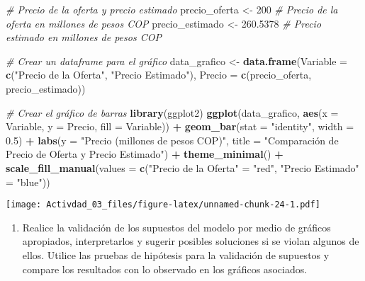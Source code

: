 \documentclass[
]{article}
\newenvironment{Shaded}{\begin{snugshade}}{\end{snugshade}}
\newcommand{\AttributeTok}[1]{\textcolor[rgb]{0.13,0.29,0.53}{#1}}
\newcommand{\CommentTok}[1]{\textcolor[rgb]{0.56,0.35,0.01}{\textit{#1}}}
\newcommand{\DecValTok}[1]{\textcolor[rgb]{0.00,0.00,0.81}{#1}}
\newcommand{\FloatTok}[1]{\textcolor[rgb]{0.00,0.00,0.81}{#1}}
\newcommand{\FunctionTok}[1]{\textcolor[rgb]{0.13,0.29,0.53}{\textbf{#1}}}
\newcommand{\NormalTok}[1]{#1}
\newcommand{\OtherTok}[1]{\textcolor[rgb]{0.56,0.35,0.01}{#1}}
\newcommand{\SpecialCharTok}[1]{\textcolor[rgb]{0.81,0.36,0.00}{\textbf{#1}}}
\newcommand{\StringTok}[1]{\textcolor[rgb]{0.31,0.60,0.02}{#1}}
\providecommand{\tightlist}{%
  \setlength{\itemsep}{0pt}\setlength{\parskip}{0pt}}
\begin{document}
\begin{Shaded}
\begin{Highlighting}[]
\CommentTok{\# Precio de la oferta y precio estimado}
\NormalTok{precio\_oferta }\OtherTok{\textless{}{-}} \DecValTok{200}  \CommentTok{\# Precio de la oferta en millones de pesos COP}
\NormalTok{precio\_estimado }\OtherTok{\textless{}{-}} \FloatTok{260.5378}  \CommentTok{\# Precio estimado en millones de pesos COP}

\CommentTok{\# Crear un dataframe para el gráfico}
\NormalTok{data\_grafico }\OtherTok{\textless{}{-}} \FunctionTok{data.frame}\NormalTok{(}\AttributeTok{Variable =} \FunctionTok{c}\NormalTok{(}\StringTok{"Precio de la Oferta"}\NormalTok{, }\StringTok{"Precio Estimado"}\NormalTok{),}
                           \AttributeTok{Precio =} \FunctionTok{c}\NormalTok{(precio\_oferta, precio\_estimado))}

\CommentTok{\# Crear el gráfico de barras}
\FunctionTok{library}\NormalTok{(ggplot2)}
\FunctionTok{ggplot}\NormalTok{(data\_grafico, }\FunctionTok{aes}\NormalTok{(}\AttributeTok{x =}\NormalTok{ Variable, }\AttributeTok{y =}\NormalTok{ Precio, }\AttributeTok{fill =}\NormalTok{ Variable)) }\SpecialCharTok{+}
  \FunctionTok{geom\_bar}\NormalTok{(}\AttributeTok{stat =} \StringTok{"identity"}\NormalTok{, }\AttributeTok{width =} \FloatTok{0.5}\NormalTok{) }\SpecialCharTok{+}
  \FunctionTok{labs}\NormalTok{(}\AttributeTok{y =} \StringTok{"Precio (millones de pesos COP)"}\NormalTok{, }\AttributeTok{title =} \StringTok{"Comparación de Precio de Oferta y Precio Estimado"}\NormalTok{) }\SpecialCharTok{+}
  \FunctionTok{theme\_minimal}\NormalTok{() }\SpecialCharTok{+}
  \FunctionTok{scale\_fill\_manual}\NormalTok{(}\AttributeTok{values =} \FunctionTok{c}\NormalTok{(}\StringTok{"Precio de la Oferta"} \OtherTok{=} \StringTok{"red"}\NormalTok{, }\StringTok{"Precio Estimado"} \OtherTok{=} \StringTok{"blue"}\NormalTok{))}
\end{Highlighting}
\end{Shaded}

\texttt{[image: Activdad\_03\_files/figure-latex/unnamed-chunk-24-1.pdf]}

\begin{enumerate}
\def\labelenumi{\arabic{enumi}.}
\setcounter{enumi}{6}
\tightlist
\item
  Realice la validación de los supuestos del modelo por medio de
  gráficos apropiados, interpretarlos y sugerir posibles soluciones si
  se violan algunos de ellos. Utilice las pruebas de hipótesis para la
  validación de supuestos y compare los resultados con lo observado en
  los gráficos asociados.
\end{enumerate}
\end{document}
